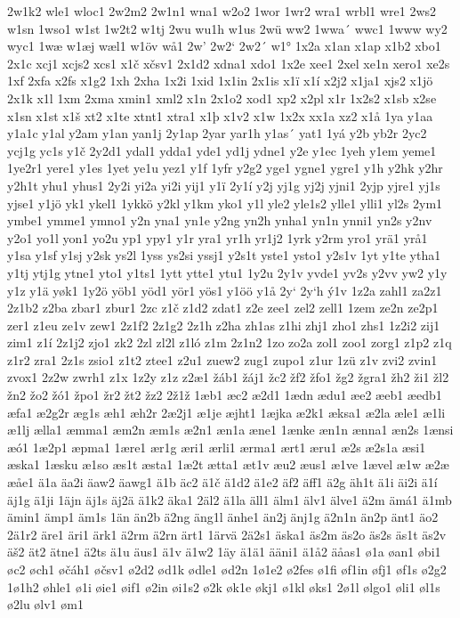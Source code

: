 2w1k2
wle1
wloc1
2w2m2
2w1n1
wna1
w2o2
1wor
1wr2
wra1
wrbl1
wre1
2ws2
w1sn
1wso1
w1st
1w2t2
w1tj
2wu
wu1h
w1us
2wü
ww2
1wwa´
wwc1
1www
wy2
wyc1
1wæ
w1æj
wæl1
w1öv
wå1
2w'
2w2`
2w2´
w1°
1x2a
x1an
x1ap
x1b2
xbo1
2x1c
xcj1
xcjs2
xcs1
x1č
xčsv1
2x1d2
xdna1
xdo1
1x2e
xee1
2xel
xe1n
xero1
xe2s
1xf
2xfa
x2fs
x1g2
1xh
2xha
1x2i
1xid
1x1in
2x1is
x1ï
x1í
x2j2
x1ja1
xjs2
x1jö
2x1k
x1l
1xm
2xma
xmin1
xml2
x1n
2x1o2
xod1
xp2
x2pl
x1r
1x2s2
x1sb
x2se
x1sn
x1st
x1š
xt2
x1te
xtnt1
xtra1
x1þ
x1v2
x1w
1x2x
xx1a
xz2
x1å
1ya
y1aa
y1a1c
y1al
y2am
y1an
yan1j
2y1ap
2yar
yar1h
y1as´
yat1
1yá
y2b
yb2r
2yc2
ycj1g
yc1s
y1č
2y2d1
ydal1
ydda1
yde1
yd1j
ydne1
y2e
y1ec
1yeh
y1em
yeme1
1ye2r1
yere1
y1es
1yet
ye1u
yez1
y1f
1yfr
y2g2
yge1
ygne1
ygre1
y1h
y2hk
y2hr
y2h1t
yhu1
yhus1
2y2i
yi2a
yi2i
yij1
y1ï
2y1í
y2j
yj1g
yj2j
yjni1
2yjp
yjre1
yj1s
yjse1
y1jö
yk1
ykel1
1ykkö
y2kl
y1km
yko1
y1l
yle2
yle1s2
ylle1
ylli1
yl2s
2ym1
ymbe1
ymme1
ymno1
y2n
yna1
yn1e
y2ng
yn2h
ynha1
yn1n
ynni1
yn2s
y2nv
y2o1
yo1l
yon1
yo2u
yp1
ypy1
y1r
yra1
yr1h
yr1j2
1yrk
y2rm
yro1
yrä1
yrå1
y1sa
y1sf
y1sj
y2sk
ys2l
1yss
ys2si
yssj1
y2s1t
yste1
ysto1
y2s1v
1yt
y1te
ytha1
y1tj
ytj1g
ytne1
yto1
y1ts1
1ytt
ytte1
ytu1
1y2u
2y1v
yvde1
yv2s
y2vv
yw2
y1y
y1z
y1ä
yøk1
1y2ö
yöb1
yöd1
yör1
yös1
y1öö
y1å
2y`
2y`h
ý1v
1z2a
zahl1
za2z1
2z1b2
z2ba
zbar1
zbur1
2zc
z1č
z1d2
zdat1
z2e
zee1
zel2
zell1
1zem
ze2n
ze2p1
zer1
z1eu
ze1v
zew1
2z1f2
2z1g2
2z1h
z2ha
zh1as
z1hi
zhj1
zho1
zhs1
1z2i2
zij1
zim1
z1í
2z1j2
zjo1
zk2
2zl
zl2l
z1ló
z1m
2z1n2
1zo
zo2a
zol1
zoo1
zorg1
z1p2
z1q
z1r2
zra1
2z1s
zsio1
z1t2
ztee1
z2u1
zuew2
zug1
zupo1
z1ur
1zü
z1v
zvi2
zvin1
zvox1
2z2w
zwrh1
z1x
1z2y
z1z
z2æ1
žáb1
žáj1
žc2
žf2
žfo1
žg2
žgra1
žh2
ži1
žl2
žn2
žo2
žó1
žpo1
žr2
žt2
žz2
2ž1ž
1æb1
æc2
æ2d1
1ædn
ædu1
æe2
æeb1
æedb1
æfa1
æ2g2r
æg1s
æh1
æh2r
2æ2j1
æ1je
æjht1
1æjka
æ2k1
æksa1
æ2la
æle1
æ1li
æ1lj
ælla1
æmma1
æm2n
æm1s
æ2n1
æn1a
æne1
1ænke
æn1n
ænna1
æn2s
1ænsi
æó1
1æ2p1
æpma1
1ære1
ær1g
æri1
ærli1
ærma1
ært1
æru1
æ2s
æ2s1a
æsi1
æska1
1æsku
æ1so
æs1t
æsta1
1æ2t
ætta1
æt1v
æu2
æus1
æ1ve
1ævel
æ1w
æ2æ
æåe1
ä1a
äa2i
äaw2
äawg1
ä1b
äc2
ä1č
ä1d2
ä1e2
äf2
äff1
ä2g
äh1t
ä1i
äi2i
ä1í
äj1g
ä1ji
1äjn
äj1s
äj2ä
ä1k2
äka1
2äl2
ä1la
äll1
älm1
älv1
älve1
ä2m
ämá1
ä1mb
ämin1
ämp1
äm1s
1än
än2b
ä2ng
äng1l
änhe1
än2j
änj1g
ä2n1n
än2p
änt1
äo2
2ä1r2
äre1
äri1
ärk1
ä2rm
ä2rn
ärt1
1ärvä
2ä2s1
äska1
äs2m
äs2o
äs2s
äs1t
äs2v
äš2
ät2
ätne1
ä2ts
ä1u
äus1
ä1v
ä1w2
1äy
ä1ä1
ääni1
ä1å2
äåas1
ø1a
øan1
øbi1
øc2
øch1
øčáh1
øčsv1
ø2d2
ød1k
ødle1
ød2n
1ø1e2
ø2fes
ø1fi
øf1in
øfj1
øf1s
ø2g2
1ø1h2
øhle1
ø1i
øie1
øif1
ø2in
øi1s2
ø2k
øk1e
økj1
ø1kl
øks1
2ø1l
ølgo1
øli1
øl1s
ø2lu
ølv1
øm1
